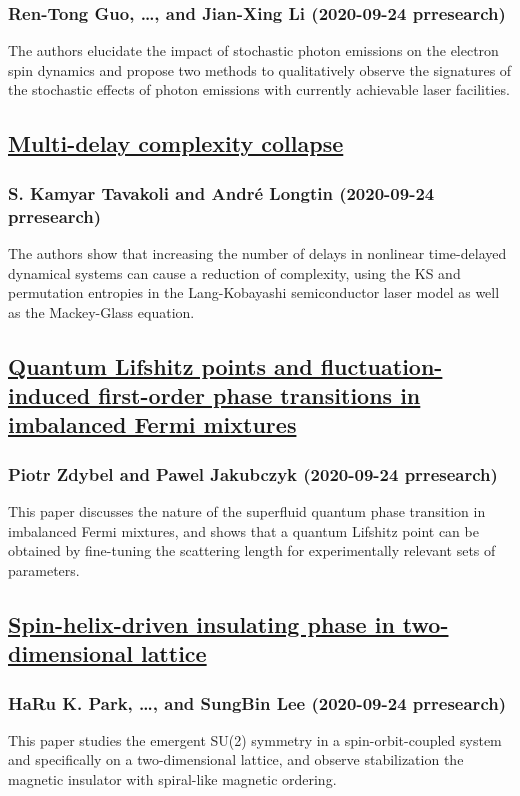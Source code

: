 \subsubsection*{Ren-Tong Guo, \dots, and Jian-Xing Li (2020-09-24 prresearch)}
The authors elucidate the impact of stochastic photon emissions on the electron spin dynamics and propose two methods to qualitatively observe the signatures of the stochastic effects of photon emissions with currently achievable laser facilities.
\subsection*{\href{http://link.aps.org/doi/10.1103/PhysRevResearch.2.033485}{Multi-delay complexity collapse}}
\subsubsection*{S. Kamyar Tavakoli and André Longtin (2020-09-24 prresearch)}
The authors show that increasing the number of delays in nonlinear time-delayed dynamical systems can cause a reduction of complexity, using the KS and permutation entropies in the Lang-Kobayashi semiconductor laser model as well as the Mackey-Glass equation.
\subsection*{\href{http://link.aps.org/doi/10.1103/PhysRevResearch.2.033486}{Quantum Lifshitz points and fluctuation-induced first-order phase transitions in imbalanced Fermi mixtures}}
\subsubsection*{Piotr Zdybel and Pawel Jakubczyk (2020-09-24 prresearch)}
This paper discusses the nature of the superfluid quantum phase transition in imbalanced Fermi mixtures, and shows that a quantum Lifshitz point can be obtained by fine-tuning the scattering length for experimentally relevant sets of parameters.
\subsection*{\href{http://link.aps.org/doi/10.1103/PhysRevResearch.2.033487}{Spin-helix-driven insulating phase in two-dimensional lattice}}
\subsubsection*{HaRu K. Park, \dots, and SungBin Lee (2020-09-24 prresearch)}
This paper studies the emergent SU(2) symmetry in a spin-orbit-coupled system and specifically on a two-dimensional lattice, and observe stabilization the magnetic insulator with spiral-like magnetic ordering.
